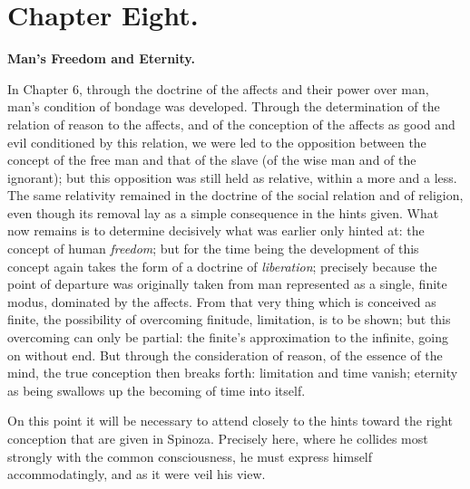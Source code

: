 \documentclass[12pt,a4paper,openany]{book}
\newcommand{\opage}[1]{\marginnote{\footnotesize\textit{[#1]}}}
\begin{document}
\newpage

\chapter*{Chapter Eight.}

\begin{center}
\textbf{Man's Freedom and Eternity.}
\end{center}

\opage{162} In Chapter 6, through the doctrine of the affects and
their power over man, man's condition of bondage was
developed. Through the determination of the relation of reason to
the affects, and of the conception of the affects as good and evil
conditioned by this relation, we were led to the opposition between
the concept of the free man and that of the slave (of the wise man and of the ignorant);
but this opposition was still held as relative, within
a more and a less. The same relativity remained
in the doctrine of the social relation and of religion, even though
its removal lay as a simple consequence in the
hints given. What now remains is to determine decisively
what was earlier only hinted at: the concept of human
\emph{freedom}; but for the time being the development of this concept
again takes the form of a doctrine of \emph{liberation}; precisely because the point of departure
was originally taken from man represented as a single, finite modus,
dominated by the affects. From
that very thing which is conceived as finite, the possibility of overcoming finitude,
limitation, is to be shown; but this
overcoming can only be partial: the finite's approximation to
the infinite, going on without end. But through
the consideration of reason, of the essence of the mind, the
true conception then breaks forth: limitation
and time vanish; eternity as being swallows up the becoming of time into itself.

On this point it will be necessary to attend closely
to the hints toward the right conception that are given
in Spinoza. Precisely here, where he collides most strongly
with the common consciousness, he must express himself accommodatingly,
and as it were veil his view.
\end{document}
